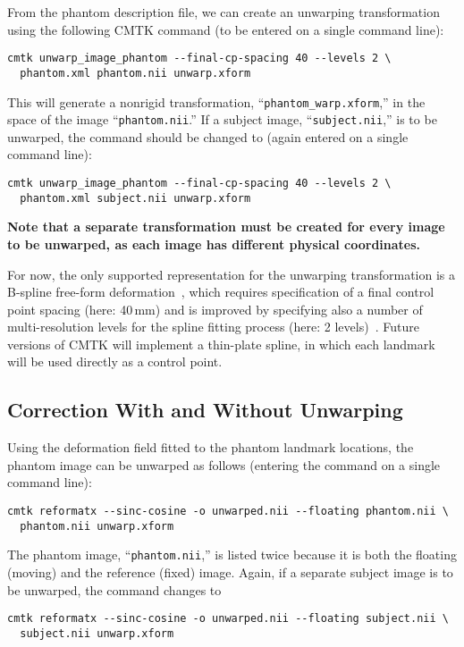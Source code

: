\documentclass{InsightArticle}
\begin{document}
From the phantom description file, we can create an unwarping transformation
using the following CMTK command (to be entered on a single command line):
\begin{verbatim}
cmtk unwarp_image_phantom --final-cp-spacing 40 --levels 2 \
  phantom.xml phantom.nii unwarp.xform
\end{verbatim} 
This will generate a nonrigid transformation,
``\texttt{phantom\_warp.xform},'' in the space of the image
``\texttt{phantom.nii}.'' If a subject image, ``\texttt{subject.nii},'' is to
be unwarped, the command should be changed to (again entered on a single
command line):
\begin{verbatim}
cmtk unwarp_image_phantom --final-cp-spacing 40 --levels 2 \
  phantom.xml subject.nii unwarp.xform
\end{verbatim}

{\bf Note that a separate transformation must be created for every
  image to be unwarped, as each image has different physical coordinates.}

For now, the only supported representation for the unwarping transformation is
a B-spline free-form deformation~\cite{RuecSonoHaye:1999}, which requires
specification of a final control point spacing (here: 40\,mm) and is improved
by specifying also a number of multi-resolution levels for the spline fitting
process (here: 2 levels)~\cite{LeeWolbShin:1997}. Future versions of CMTK will
implement a thin-plate spline, in which each landmark will be used directly as
a control point.

\subsection{Correction With and Without Unwarping}

Using the deformation field fitted to the phantom landmark locations, the
phantom image can be unwarped as follows (entering the command on a single
command line):
\begin{verbatim}
cmtk reformatx --sinc-cosine -o unwarped.nii --floating phantom.nii \
  phantom.nii unwarp.xform
\end{verbatim} 
The phantom image, ``\texttt{phantom.nii},'' is listed twice
because it is both the floating (moving) and the reference (fixed)
image. Again, if a separate subject image is to be unwarped, the command
changes to
\begin{verbatim}
cmtk reformatx --sinc-cosine -o unwarped.nii --floating subject.nii \
  subject.nii unwarp.xform
\end{verbatim}
\end{document}
